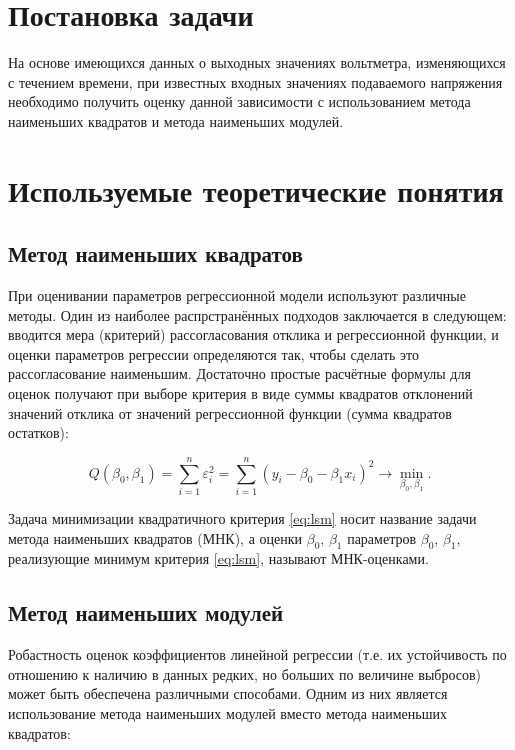 \documentclass[12pt]{article}
\begin{document}
\tableofcontents\newpage

\section{Постановка задачи}

На основе имеющихся данных о выходных значениях вольтметра, изменяющихся с течением времени, при известных входных значениях подаваемого напряжения необходимо получить оценку данной зависимости с использованием метода наименьших квадратов и метода наименьших модулей.
\section{Используемые теоретические понятия}
\subsection{Метод наименьших квадратов}
При оценивании параметров регрессионной модели используют различные
методы. Один из наиболее распрстранённых подходов заключается в
следующем: вводится мера (критерий) рассогласования отклика и
регрессионной функции, и оценки параметров регрессии определяются так,
чтобы сделать это рассогласование наименьшим. Достаточно простые
расчётные формулы для оценок получают при выборе критерия в виде суммы
квадратов отклонений значений отклика от значений регрессионной функции
(сумма квадратов остатков):

\begin{equation} \label{eq:lsm}
    Q(\beta_0, \beta_1) = \sum \limits_{i=1}^n \varepsilon_i^2 =
    \sum \limits_{i=1}^n (y_i - \beta_0 - \beta_1 x_i)^2 \rightarrow
    \min_{\beta_0, \beta_1}.
\end{equation}

Задача минимизации квадратичного критерия \eqref{eq:lsm} носит название
задачи метода наименьших квадратов (МНК), а оценки \( \beta_0 \),
\( \beta_1 \) параметров \( \beta_0 \), \( \beta_1 \), реализующие минимум
критерия \eqref{eq:lsm}, называют МНК-оценками.

\subsection{Метод наименьших модулей}

Робастность оценок коэффициентов линейной регрессии (т.е. их
устойчивость по отношению к наличию в данных редких, но больших по
величине выбросов) может быть обеспечена различными способами. Одним из
них является использование метода наименьших модулей вместо метода
наименьших квадратов:
\end{document}
